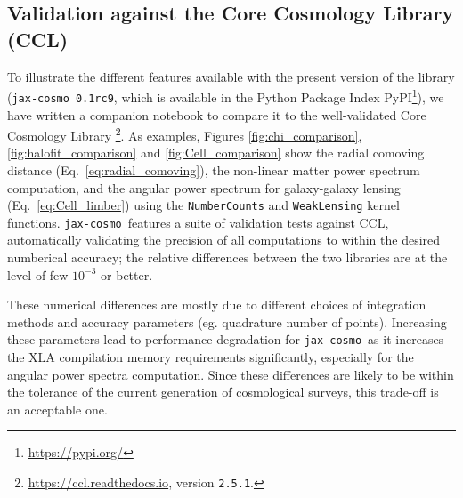 \documentclass[twocolumn,twocolappendix,nofootinbib,iop]{openjournal}
\newcommand{\nblink}[1]{\href{https://github.com/DifferentiableUniverseInitiative/jax-cosmo-paper/blob/master/notebooks/#1.ipynb}{\faFileCodeO}}
\newcommand{\jaxcosmo}{\texttt{jax-cosmo}}
\begin{document}
\subsection{Validation against the Core Cosmology Library (CCL)}
%
To illustrate the different features available with the present version of the library (\jaxcosmo\ \texttt{0.1rc9}, which is available in the Python Package Index PyPI\footnote{\url{https://pypi.org/}}), we have written a  companion notebook \nblink{CCL_comparison} to compare it to the well-validated  Core Cosmology Library \citep{2019ApJS..242....2C}\footnote{\url{https://ccl.readthedocs.io}, version \texttt{2.5.1}.}. As examples, Figures \ref{fig:chi_comparison},
\ref{fig:halofit_comparison} and \ref{fig:Cell_comparison}
show the radial comoving distance (Eq.~\ref{eq:radial_comoving}), the non-linear matter power spectrum computation, and the angular power spectrum for galaxy-galaxy lensing (Eq.~\ref{eq:Cell_limber}) using the \texttt{NumberCounts} and \texttt{WeakLensing} kernel functions. \jaxcosmo\ features a suite of validation tests against CCL, automatically validating the precision of all computations to within the desired numberical accuracy; the relative differences between the two libraries are at the level of few $10^{-3}$ or better.

These numerical differences are mostly due to different choices of integration methods and accuracy parameters (eg. quadrature number of points). Increasing these parameters lead to performance degradation for \jaxcosmo\ as it increases the XLA compilation memory requirements significantly, especially for the angular power spectra computation. Since these differences are likely to be within the tolerance of the current generation of cosmological surveys, this trade-off is an acceptable one.
\end{document}
